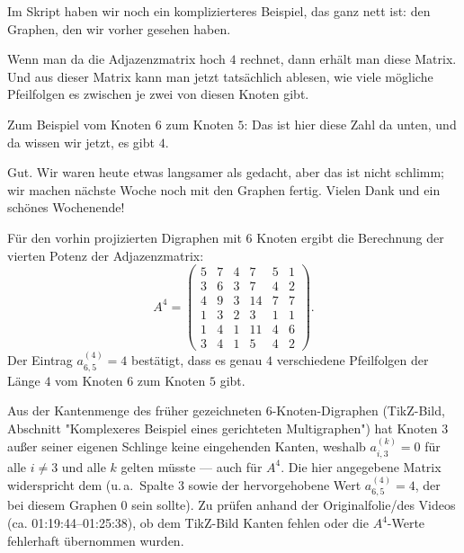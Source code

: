 \begin{spoken-clean}[01:19:44 - 01:25:38]
Im Skript haben wir noch ein komplizierteres Beispiel, das ganz nett ist: den Graphen, den wir vorher gesehen haben.

Wenn man da die Adjazenzmatrix hoch $4$ rechnet, dann erhält man diese Matrix. Und aus dieser Matrix kann man jetzt tatsächlich ablesen, wie viele mögliche Pfeilfolgen es zwischen je zwei von diesen Knoten gibt.

Zum Beispiel vom Knoten $6$ zum Knoten $5$: Das ist hier diese Zahl da unten, und da wissen wir jetzt, es gibt $4$.

Gut. Wir waren heute etwas langsamer als gedacht, aber das ist nicht schlimm; wir machen nächste Woche noch mit den Graphen fertig. Vielen Dank und ein schönes Wochenende! 
\end{spoken-clean}

\begin{math-stroke}
\begin{meta-note}
Für den vorhin projizierten Digraphen mit $6$ Knoten ergibt die Berechnung der vierten Potenz der Adjazenzmatrix:
\[
A^4 = \begin{pmatrix}
5 & 7 & 4 & 7 & 5 & 1 \\
3 & 6 & 3 & 7 & 4 & 2 \\
4 & 9 & 3 & 14 & 7 & 7 \\
1 & 3 & 2 & 3 & 1 & 1 \\
1 & 4 & 1 & 11 & 4 & 6 \\
3 & 4 & 1 & 5 & 4 & 2
\end{pmatrix}.
\]
Der Eintrag $a_{6,5}^{(4)} = 4$ bestätigt, dass es genau $4$ verschiedene Pfeilfolgen der Länge $4$ vom Knoten $6$ zum Knoten $5$ gibt.
\end{meta-note}
\end{math-stroke}

\begin{ai-note}
Aus der Kantenmenge des früher gezeichneten 6-Knoten-Digraphen (TikZ-Bild, Abschnitt "Komplexeres Beispiel eines gerichteten Multigraphen") hat Knoten $3$ außer seiner eigenen Schlinge keine eingehenden Kanten, weshalb $a_{i,3}^{(k)}=0$ für alle $i\neq 3$ und alle $k$ gelten müsste --- auch für $A^4$. Die hier angegebene Matrix widerspricht dem (u.\,a.\ Spalte 3 sowie der hervorgehobene Wert $a_{6,5}^{(4)}=4$, der bei diesem Graphen $0$ sein sollte). Zu prüfen anhand der Originalfolie/des Videos (ca. 01:19:44--01:25:38), ob dem TikZ-Bild Kanten fehlen oder die $A^4$-Werte fehlerhaft übernommen wurden.
\end{ai-note}

